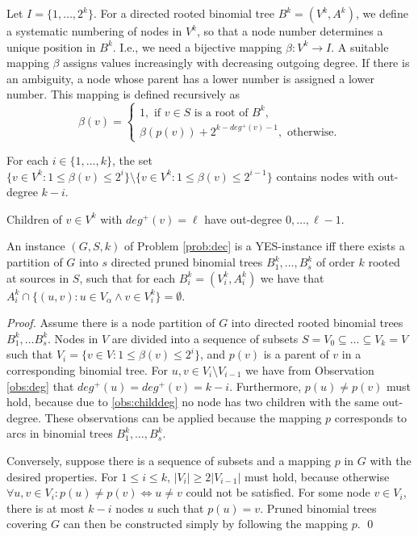 Let $I=\{1,\dots,2^k\}$.
For a directed rooted binomial tree $B^k=(V^k,A^k)$, we define a systematic numbering of nodes in $V^k$, so that a node number determines a unique position in $B^k$.
I.e., we need a bijective mapping $\beta: V^k \to I$.
A suitable mapping $\beta$ assigns values increasingly with decreasing outgoing degree. 
If there is an ambiguity, a node whose parent has a lower number is assigned a lower number.
This mapping is defined recursively as
\begin{equation}
\label{eq:beta}
\beta(v)=\begin{cases}
1,\text{ if } v\in S \text{ is a root of } B^k,\\
\beta(p(v)) + 2^{k-deg^+(v)-1}, \text{ otherwise}.
\end{cases}
\end{equation}
\begin{observation}\label{obs:deg}
For each $i\in\{1,\dots,k\}$, the set $\{v\in V^k: 1\leq\beta(v)\leq2^i\}\setminus\{v\in V^k:1\leq\beta(v)\leq2^{i-1}\}$ contains nodes with out-degree $k-i$.
\end{observation}
\begin{observation}\label{obs:childdeg}
Children of $v\in V^k$ with $deg^+(v)=\ell$ have out-degree $0,\dots,\ell-1$.
\end{observation}
\begin{proposition}\label{lem:probeq}
An instance $(G,S,k)$ of Problem \ref{prob:dec} is a YES-instance iff 
there exists a partition of $G$ into $s$ directed pruned binomial trees $B^k_1,\dots,B^k_{s}$ of order $k$ rooted at sources in $S$,
such that for each $B^k_i=(V^k_i,A^k_i)$ we have that $A^k_i\cap\{(u,v):u \in V_\alpha \wedge v\in V^k_i\}=\emptyset$. 
\end{proposition}
\begin{proof}
Assume there is a node partition of $G$ into directed rooted binomial trees $B^k_1,\dots B^k_{s}$. 
Nodes in $V$ are divided into a sequence of subsets $S=V_0\subseteq\dots\subseteq V_k=V$ such that $V_i=\{v\in V:1\leq\beta(v)\leq 2^i\}$,
and $p(v)$ is a parent of $v$ in a corresponding binomial tree.
For $u,v\in V_i\setminus V_{i-1}$ we have from Observation \ref{obs:deg} that $deg^+(u)=deg^+(v)=k-i$.
Furthermore, $p(u)\neq p(v)$ must hold, because due to \ref{obs:childdeg} no node has two children with the same out-degree.
These observations can be applied because the mapping $p$ corresponds to arcs in binomial trees $B^k_1,\dots,B^k_{s}$. 

Conversely, suppose there is a sequence of subsets and a mapping $p$ in $G$ with the desired properties.
For $1\leq i\leq k$, $|V_i|\geq2|V_{i-1}|$ must hold, because otherwise $\forall u,v\in V_i:p(u)\neq p(v)\Leftrightarrow u\neq v$ could not be satisfied.
For some node $v\in V_i$, there is at most $k-i$ nodes $u$ such that $p(u)=v$.
Pruned binomial trees covering $G$ can then be constructed simply by following the mapping $p$.
\qed
\end{proof}

